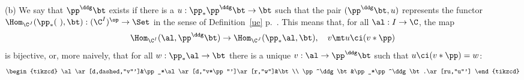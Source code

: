 \documentclass[12pt]{article}
\theoremstyle{remark}
\theoremstyle{definition}
\begin{document}
\nn(b) We say that $\pp^\ddg\bt$ exists if there is a $u:\pp_*\pp^\ddg\bt\to\bt$ such that the pair $(\pp^\ddg\bt,u)$ represents the functor $\Hom_{\C^J}(\pp_*(\ ),\bt):(\C^I)^{\op}\to\Set$ in the sense of Definition~\ref{ue} p.~. This means that, for all $\al:I\to\C$, the map 
$$
\Hom_{\C^I}(\al,\pp^\ddg\bt)\to\Hom_{\C^J}(\pp_*\al,\bt),\quad v\mt u\ci(v*\pp)
$$ 
is bijective, or, more naively, that for all $w:\pp_*\al\to\bt$ there is a unique $v:\al\to\pp^\ddg\bt$ such that $u\ci(v*\pp)=w$: 
$$
\begin{tikzcd}
\al\ar[d,dashed,"v"']&\pp_*\al\ar[d,"v*\pp"']\ar[r,"w"]&\bt\\ 
\pp^\ddg\bt&\pp_*\pp^\ddg\bt.\ar[ru,"u"']
\end{tikzcd}
$$ 
\end{document}
